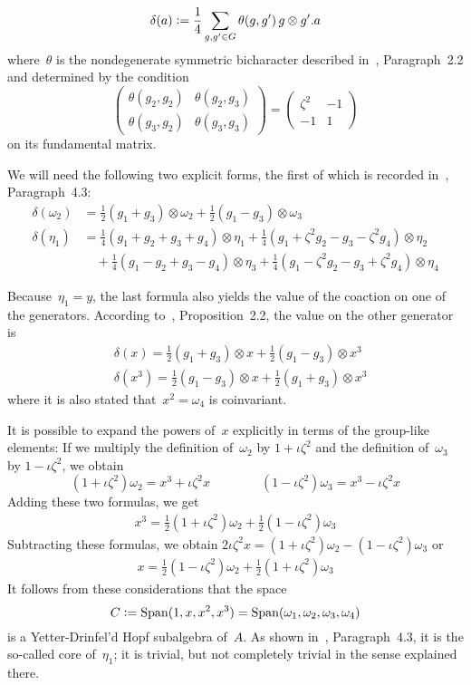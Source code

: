 \documentclass{article}
\numberwithin{equation}{section}
\theoremstyle{definition}
\theoremstyle{break}
\newcommand{\Span}{\operatorname{Span}}
\newcommand{\ot}{\mathbin{\otimes}}
\newcommand{\deq}{\vcentcolon =}
\newcommand{\K}{1}
\newcommand{\1}{{(1)}}
\newcommand{\2}{{(2)}}
\newcommand{\3}{{(3)}}
\begin{document}
\begin{equation}
\delta(a) \deq \frac{1}{4} \sum_{g,g' \in G} \theta(g,g') \, g \ot g'.a \label{coaction}
\end{equation}
where~$\theta$ is the nondegenerate symmetric bicharacter described in~\cite{KaSo2}, Paragraph~2.2 and determined by the condition
\[\begin{pmatrix}
\theta(g_2,g_2) & \theta(g_2,g_3) \\
\theta(g_3,g_2) & \theta(g_3,g_3)
\end{pmatrix} =
\begin{pmatrix}
\zeta^2 & -1 \\
-1 & 1
\end{pmatrix} \]
on its fundamental matrix.

We will need the following two explicit forms, the first of which is recorded in~\cite{KaSo2}, Paragraph~4.3:
\begin{align*}
\delta(\omega_2) &= \frac{1}{2} (g_1 + g_3) \ot \omega_2 
+ \frac{1}{2} (g_1 - g_3) \ot \omega_3\\
\delta(\eta_1) &= \frac{1}{4}(g_1+g_2+g_3+g_4) \ot \eta_1 
+ \frac{1}{4}(g_1+\zeta^2 g_2-g_3-\zeta^2 g_4) \ot \eta_2\\
&\quad + \frac{1}{4}(g_1-g_2+g_3-g_4) \ot \eta_3 + \frac{1}{4}(g_1-\zeta^2 g_2-g_3+\zeta^2 g_4)\ot  \eta_4
\end{align*}

Because~$\eta_1 = y$, the last formula also yields the value of the coaction on one of the generators. According to~\cite{KaSo2}, Proposition~2.2, the value on the other generator is
\begin{align*}
&\delta(x) = \frac{\K}{2} (g_1 + g_3) \ot x + \frac{\K}{2} (g_1 - g_3) \ot x^3 \\
&\delta(x^3) = \frac{\K}{2} (g_1 - g_3) \ot x + \frac{\K}{2} (g_1 + g_3) \ot x^3
\end{align*}
where it is also stated that~$x^2 = \omega_4$ is coinvariant.

It is possible to expand the powers of~$x$ explicitly in terms of the group-like elements: If we multiply the definition of~$\omega_2$ by $1 + \iota \zeta^2$ and the definition of~$\omega_3$ by $1 - \iota \zeta^2$, we obtain
\[(1 + \iota \zeta^2) \omega_2 = x^3 + \iota \zeta^2 x \qquad \qquad
(1 - \iota \zeta^2) \omega_3 = x^3 - \iota \zeta^2 x\]
Adding these two formulas, we get
\begin{align*}
x^3 = \frac{1}{2} (1 + \iota \zeta^2) \omega_2 + \frac{1}{2} (1 - \iota \zeta^2) \omega_3
\end{align*}
Subtracting these formulas, we obtain
$2 \iota \zeta^2 x = (1 + \iota \zeta^2) \omega_2 - (1 - \iota \zeta^2) \omega_3$ or
\begin{align*}
x = \frac{1}{2} (1 - \iota \zeta^2) \omega_2 + \frac{1}{2} (1 + \iota \zeta^2) \omega_3 
\end{align*}
It follows from these considerations that the space
\[C \deq \Span(1, x, x^2 ,x^3) = \Span(\omega_1, \omega_2, \omega_3, \omega_4)\]
is a Yetter-Drinfel'd Hopf subalgebra of~$A$. As shown in~\cite{KaSo2}, Paragraph~4.3, it is the so-called core of~$\eta_1$; it is trivial, but not completely trivial in the sense explained there.
\end{document}
